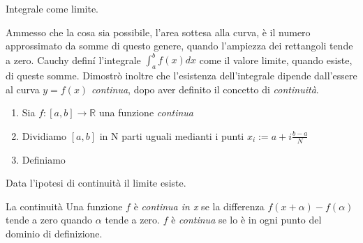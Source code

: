 \begin{frame}
  \begin{block}{Integrale come limite.}

    \alert{Ammesso che la cosa sia possibile}, l'area sottesa alla curva,
    è il numero approssimato da somme di questo genere, quando l'ampiezza dei rettangoli
    tende a zero. 
    Cauchy definí l'integrale $\int_{a}^bf(x)dx$ come il valore limite, quando esiste,
    di queste somme.
    Dimostrò inoltre che l'esistenza dell'integrale dipende dall'essere al curva $y=f(x)$ \textit{continua},
    dopo aver definito il concetto di \textit{continuità}.


  \begin{enumerate}
    \item Sia $f: [a,b] \rightarrow \mathbb{R}$ una funzione \textit{continua}
    \item Dividiamo $[a,b]$ in N parti uguali medianti i punti $x_i := a + i\frac{b-a}{N}$ 
    \item Definiamo 
  \end{enumerate}

  Data l'ipotesi di continuità il limite esiste.
  \end{block}

  \begin{block}{La continuità}
    Una funzione $f$ è \textit{continua in x} se la differenza $f(x+\alpha) - f(\alpha)$ 
    tende a zero quando $\alpha$ tende a zero. $f$ è \textit{continua} se lo è in ogni
    punto del dominio di definizione.
  \end{block}


\end{frame}


